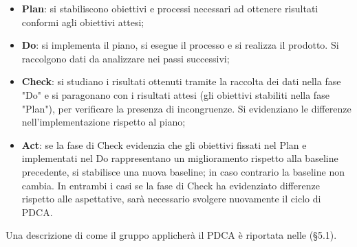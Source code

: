 \begin{itemize}
\item \textbf{Plan}: si stabiliscono obiettivi e processi necessari ad ottenere risultati conformi agli obiettivi attesi;
\item \textbf{Do}: si implementa il piano, si esegue il processo e si realizza il prodotto. Si raccolgono dati da analizzare nei passi successivi;
\item \textbf{Check}: si studiano i risultati ottenuti tramite la raccolta dei dati nella fase "Do" e si paragonano con i risultati attesi (gli obiettivi stabiliti nella fase "Plan"), per verificare la presenza di incongruenze. Si evidenziano le differenze nell'implementazione rispetto al piano;
\item \textbf{Act}: se la fase di Check evidenzia che gli obiettivi fissati nel Plan e implementati nel Do rappresentano un miglioramento rispetto alla baseline precedente, si stabilisce una nuova baseline; in caso contrario la baseline non cambia. In entrambi i casi se la fase di Check ha evidenziato differenze rispetto alle aspettative, sarà necessario svolgere nuovamente il ciclo di PDCA.
\end{itemize}
Una descrizione di come il gruppo applicherà il PDCA è riportata nelle \NormeDiProgetto (\S5.1).